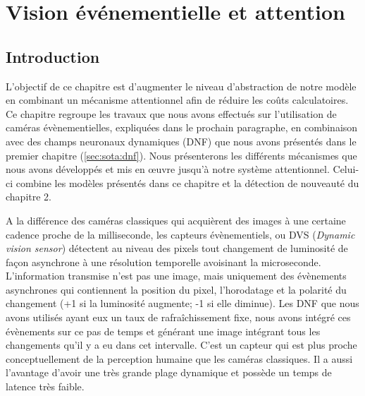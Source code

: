 
\chapter{Vision événementielle et attention}
	\minitoc
	\newpage





	\section{Introduction}

	L'objectif de ce chapitre est d'augmenter le niveau d'abstraction de notre modèle en combinant un mécanisme attentionnel afin de réduire les coûts calculatoires. Ce chapitre regroupe les travaux que nous avons effectués sur l'utilisation de caméras évènementielles, expliquées dans le prochain paragraphe, en combinaison avec des champs neuronaux dynamiques (DNF) que nous avons présentés dans le premier chapitre (\ref{sec:sota:dnf}). Nous présenterons les différents mécanismes que nous avons développés et mis en œuvre jusqu'à notre système attentionnel. Celui-ci combine les modèles présentés dans ce chapitre et la détection de nouveauté du chapitre 2. 

	A la différence des caméras classiques qui acquièrent des images à une certaine cadence proche de la milliseconde, les capteurs évènementiels, ou DVS (\textit{Dynamic vision sensor}) détectent au niveau des pixels tout changement de luminosité de façon asynchrone à une résolution temporelle avoisinant la microseconde. L'information transmise n'est pas une image, mais uniquement des évènements asynchrones qui contiennent la position du pixel, l'horodatage et la polarité du changement (+1 si la luminosité augmente; -1 si elle diminue). Les DNF que nous avons utilisés ayant eux un taux de rafraîchissement fixe, nous avons intégré ces évènements sur ce pas de temps et générant une image intégrant tous les changements qu'il y a eu dans cet intervalle. C'est un capteur qui est plus proche conceptuellement de la perception humaine que les caméras classiques. Il a aussi l'avantage d'avoir une très grande plage dynamique et possède un temps de latence très faible. \cite{gallego2019event}

